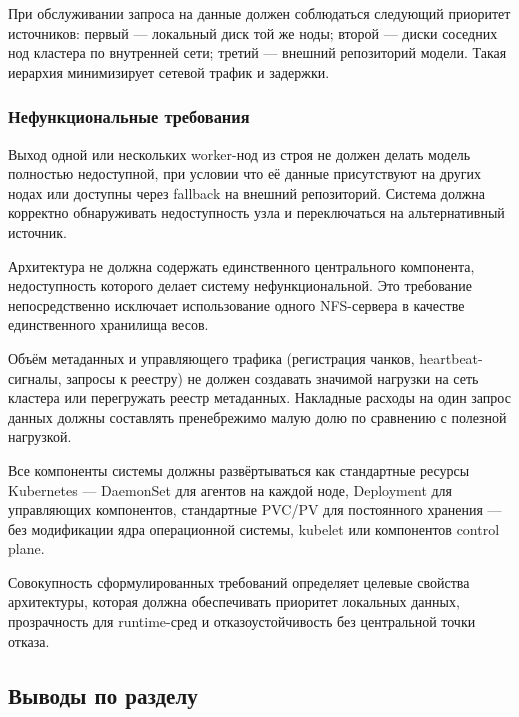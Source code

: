  При обслуживании запроса на данные должен соблюдаться следующий приоритет источников: первый --- локальный диск той же ноды; второй --- диски соседних нод кластера по внутренней сети; третий --- внешний репозиторий модели. Такая иерархия минимизирует сетевой трафик и задержки.

\subsubsection{Нефункциональные требования}

 Выход одной или нескольких worker-нод из строя не должен делать модель полностью недоступной, при условии что её данные присутствуют на других нодах или доступны через fallback на внешний репозиторий. Система должна корректно обнаруживать недоступность узла и переключаться на альтернативный источник.

 Архитектура не должна содержать единственного центрального компонента, недоступность которого делает систему нефункциональной. Это требование непосредственно исключает использование одного NFS-сервера в качестве единственного хранилища весов.

 Объём метаданных и управляющего трафика (регистрация чанков, heartbeat-сигналы, запросы к реестру) не должен создавать значимой нагрузки на сеть кластера или перегружать реестр метаданных. Накладные расходы на один запрос данных должны составлять пренебрежимо малую долю по сравнению с полезной нагрузкой.

 Все компоненты системы должны развёртываться как стандартные ресурсы Kubernetes --- DaemonSet для агентов на каждой ноде, Deployment для управляющих компонентов, стандартные PVC/PV для постоянного хранения --- без модификации ядра операционной системы, kubelet или компонентов control plane.

Совокупность сформулированных требований определяет целевые свойства архитектуры, которая должна обеспечивать приоритет локальных данных, прозрачность для runtime-сред и отказоустойчивость без центральной точки отказа.

\subsection{Выводы по разделу}

